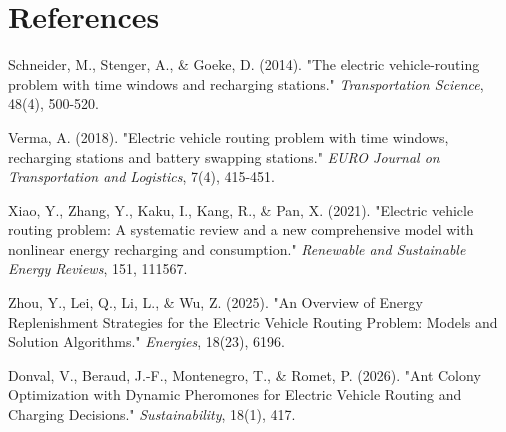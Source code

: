 \documentclass[11pt]{article}
\begin{document}
\section*{References}
\begin{enumerate} [label={[\arabic*]}]
    \item Schneider, M., Stenger, A., \& Goeke, D. (2014). "The electric vehicle-routing problem with time windows and recharging stations." \textit{Transportation Science}, 48(4), 500-520.
    \item Verma, A. (2018). "Electric vehicle routing problem with time windows, recharging stations and battery swapping stations." \textit{EURO Journal on Transportation and Logistics}, 7(4), 415-451.
    \item Xiao, Y., Zhang, Y., Kaku, I., Kang, R., \& Pan, X. (2021). "Electric vehicle routing problem: A systematic review and a new comprehensive model with nonlinear energy recharging and consumption." \textit{Renewable and Sustainable Energy Reviews}, 151, 111567.
    \item Zhou, Y., Lei, Q., Li, L., \& Wu, Z. (2025). "An Overview of Energy Replenishment Strategies for the Electric Vehicle Routing Problem: Models and Solution Algorithms." \textit{Energies}, 18(23), 6196.
    \item Donval, V., Beraud, J.-F., Montenegro, T., \& Romet, P. (2026). "Ant Colony Optimization with Dynamic Pheromones for Electric Vehicle Routing and Charging Decisions." \textit{Sustainability}, 18(1), 417.
\end{enumerate}
\end{document}
